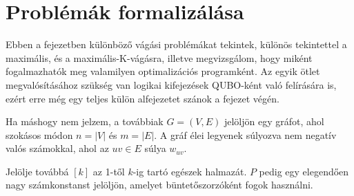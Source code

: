 
\chapter{Problémák formalizálása}\label{chap:cuts}


Ebben a fejezetben különböző vágási problémákat tekintek, különös tekintettel a maximális, és a maximális-K-vágásra, illetve megvizsgálom, hogy miként fogalmazhatók meg valamilyen optimalizációs programként. Az egyik ötlet megvalósításához szükség van logikai kifejezések QUBO-ként való felírására is, ezért erre még egy teljes külön alfejezetet szánok a fejezet végén.

Ha máshogy nem jelzem, a továbbiak $G=(V,E)$ jelöljön egy gráfot, ahol szokásos módon $n=|V|$ és $m=|E|$. A gráf élei legyenek súlyozva nem negatív valós számokkal, ahol az $uv \in E$ súlya $w_{uv}$.

Jelölje továbbá $[k]$ az 1-től $k$-ig tartó egészek halmazát. $P$ pedig egy elegendően nagy számkonstanst jelöljön, amelyet büntetőszorzóként fogok használni.



